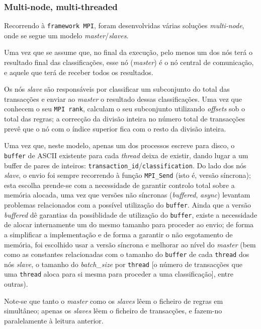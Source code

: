\documentclass[a4paper]{article}
\begin{document}
\subsubsection{Multi-node, multi-threaded}
\indent \indent Recorrendo à \texttt{framework MPI}, foram desenvolvidas várias soluções \textit{multi-node}, onde se segue um modelo \textit{master}/\textit{slaves}.

Uma vez que se assume que, no final da execução, pelo menos um dos nós terá o resultado final das classificações, esse nó (\textit{master}) é o nó central de comunicação, e aquele que terá de receber todos os resultados.

Os nós \textit{slave} são responsáveis por classificar um subconjunto do total das transacções e enviar ao \textit{master} o resultado dessas classificações. Uma vez que conhecem o seu \texttt{MPI rank}, calculam o seu subconjunto utilizando \textit{offsets} sob o total das regras; a correcção da divisão inteira no número total de transacções prevê que o nó com o índice superior fica com o resto da divisão inteira.

Uma vez que, neste modelo, apenas um dos processos escreve para disco, o \texttt{buffer} de ASCII existente para cada \textit{thread} deixa de existir, dando lugar a um buffer de pares de inteiros: \texttt{transaction\_id}/\texttt{classification}. Do lado dos nós \textit{slave}, o envio foi sempre recorrendo à função \texttt{MPI\_Send} (isto é, versão síncrona); esta escolha prende-se com a necessidade de garantir controlo total sobre a memória alocada, uma vez que versões não síncronas (\textit{buffered}, \textit{async}) levantam problemas relacionados com a possível utilização do \texttt{buffer}. Ainda que a versão \textit{buffered} dê garantias da possiblidade de utilização do \texttt{buffer}, existe a necessidade de alocar internamente um do mesmo tamanho para proceder ao envio; de forma a simplificar a implementação e de forma a garantir o não esgotamento de memória, foi escolhido usar a versão síncrona e melhorar ao nível do \textit{master} (bem como as constantes relacionadas com o tamanho do \texttt{buffer} de cada \texttt{thread} dos nós \textit{slave}, o tamanho do \textit{batch\_size} por \texttt{thread} [o número de transacções que uma \texttt{thread} aloca para si mesma para proceder a uma classificação], entre outras).

Note-se que tanto o \textit{master} como os \textit{slaves} lêem o ficheiro de regras em simultâneo; apenas os \textit{slaves} lêem o ficheiro de transacções, e fazem-no paralelamente à leitura anterior.
\end{document}

